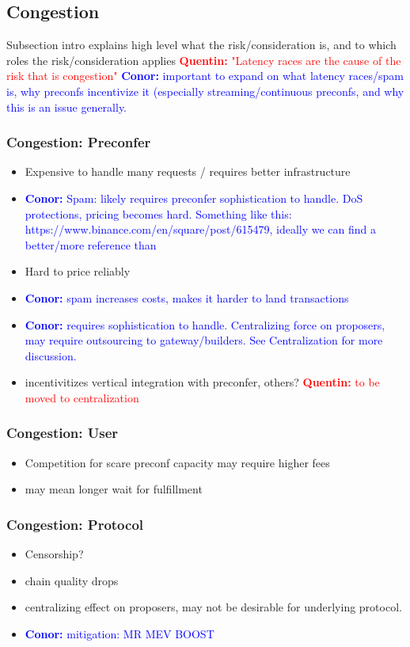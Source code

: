 \documentclass[a4paper]{article}
\theoremstyle{boldstyle}
\newcommand{\cm}[1]{\textcolor{blue}{\textbf{Conor:} #1}}
\newcommand{\qb}[1]{\textcolor{red}{\textbf{Quentin:} #1}}
\begin{document}
    
\subsection{Congestion}
    Subsection intro explains high level what the risk/consideration is, and to which roles the risk/consideration applies 
    \qb{"Latency races are the cause of the risk that is congestion"}
    \cm{important to expand on what latency races/spam is, why preconfs incentivize it (especially streaming/continuous preconfs, and why this is an issue generally.}

    \subsubsection{Congestion: Preconfer}
        \begin{itemize}
            \item Expensive to handle many requests / requires better infrastructure
            \item \cm{Spam: likely requires preconfer sophistication to handle. DoS protections, pricing becomes hard. Something like this: https://www.binance.com/en/square/post/615479, ideally we can find a better/more reference than }
            \item Hard to price reliably
            \item \cm{spam increases costs, makes it harder to land transactions}
            \item \cm{requires sophistication to handle. Centralizing force on proposers, may require outsourcing to gateway/builders. See Centralization for more discussion. }
            \item incentivitizes vertical integration with preconfer, others? \qb{to be moved to centralization}
        \end{itemize}
    
    \subsubsection{Congestion: User}
        \begin{itemize}
            \item Competition for scare preconf capacity may require higher fees 
            \item may mean longer wait for fulfillment 
            
        \end{itemize}
    
    \subsubsection{Congestion: Protocol}
        \begin{itemize}
            \item Censorship?
            \item chain quality drops
            \item centralizing effect on proposers, may not be desirable for underlying protocol.
            \item \cm{mitigation: MR MEV BOOST}
        \end{itemize}
\end{document}
